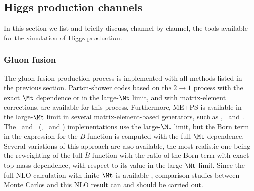 \subsection{Higgs production channels}

\label{HiggsChannels}

In this section we list and briefly discuss, channel by channel, the tools 
available for the simulation of Higgs production.

\subsubsection{Gluon fusion}


The gluon-fusion production process is implemented with all methods listed
in the previous section. Parton-shower codes based on the $2\to 1$ process
with the exact $\Mt$ dependence 
or in the large-$\Mt$ limit, and with matrix-element corrections, are 
available for this process.  Furthermore, ME+PS is available in the large-$\Mt$ limit in 
several matrix-element-based generators, such as \alpgen, \sherpa\ and \MGME.
The \MCatNLO\ and \POWHEG\ (\POWHEGBOX, \herwigpp\ and \sherpa) implementations 
use the large-$\Mt$ limit, but the Born term in the expression for the
$\bar{B}$ function is computed with the full $\Mt$ dependence. Several
variations of this approach are also available, the most realistic one
being the reweighting of the full $\bar{B}$ function with the ratio of
the Born term with exact top mass dependence, with respect to its
value in the large-$\Mt$ limit. Since the full NLO calculation with
finite $\Mt$ is available \cite{Djouadi:1991tka,Spira:1995rr},
comparison studies between Monte Carlos and this
NLO result can and should be carried out.

